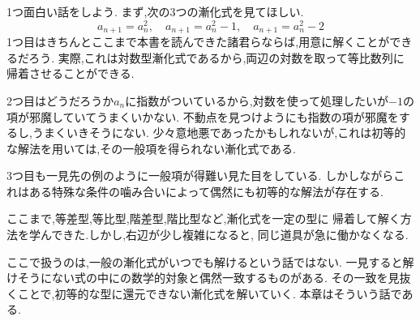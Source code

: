 1つ面白い話をしよう.
まず,次の3つの漸化式を見てほしい.
\[
  a_{n+1}=a_n^2,
  \quad
  a_{n+1}=a_n^2-1,
  \quad
  a_{n+1}=a_n^2-2
\]
1つ目はきちんとここまで本書を読んできた諸君らならば,用意に解くことができるだろう.
実際,これは対数型漸化式であるから,両辺の対数を取って等比数列に帰着させることができる.

2つ目はどうだろうか$a_n$に指数がついているから,対数を使って処理したいが$-1$の項が邪魔していてうまくいかない.
不動点を見つけようにも指数の項が邪魔をするし,うまくいきそうにない.
少々意地悪であったかもしれないが,これは初等的な解法を用いては,その一般項を得られない漸化式である.

3つ目も一見先の例のように一般項が得難い見た目をしている.
しかしながらこれはある特殊な条件の噛み合いによって偶然にも初等的な解法が存在する.

ここまで,等差型,等比型,階差型,階比型など,漸化式を一定の型に
帰着して解く方法を学んできた.しかし,右辺が少し複雑になると,
同じ道具が急に働かなくなる.

ここで扱うのは,一般の漸化式がいつでも解けるという話ではない.
一見すると解けそうにない式の中にの数学的対象と偶然一致するものがある.
その一致を見抜くことで,初等的な型に還元できない漸化式を解いていく.
本章はそういう話である.